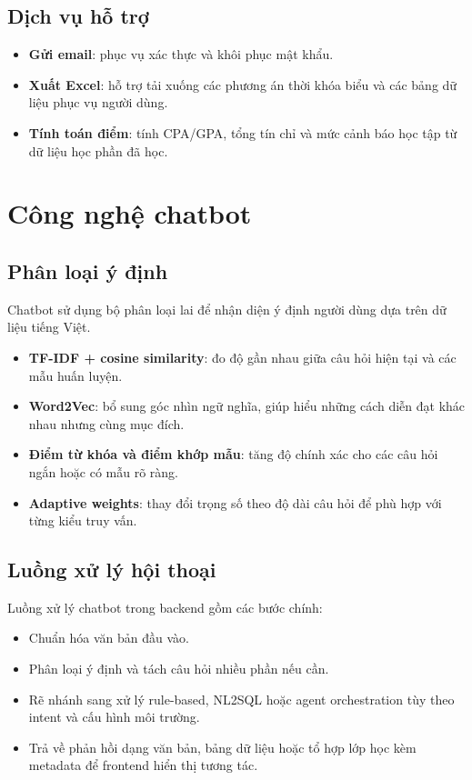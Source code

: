 \documentclass[12pt,a4paper]{report}
\begin{document}
\subsection{Dịch vụ hỗ trợ}
\begin{itemize}
    \item \textbf{Gửi email}: phục vụ xác thực và khôi phục mật khẩu.
    \item \textbf{Xuất Excel}: hỗ trợ tải xuống các phương án thời khóa biểu và các bảng dữ liệu phục vụ người dùng.
    \item \textbf{Tính toán điểm}: tính CPA/GPA, tổng tín chỉ và mức cảnh báo học tập từ dữ liệu học phần đã học.
\end{itemize}

\section{Công nghệ chatbot}
\subsection{Phân loại ý định}
Chatbot sử dụng bộ phân loại lai để nhận diện ý định người dùng dựa trên dữ liệu tiếng Việt.
\begin{itemize}
    \item \textbf{TF-IDF + cosine similarity}: đo độ gần nhau giữa câu hỏi hiện tại và các mẫu huấn luyện.
    \item \textbf{Word2Vec}: bổ sung góc nhìn ngữ nghĩa, giúp hiểu những cách diễn đạt khác nhau nhưng cùng mục đích.
    \item \textbf{Điểm từ khóa và điểm khớp mẫu}: tăng độ chính xác cho các câu hỏi ngắn hoặc có mẫu rõ ràng.
    \item \textbf{Adaptive weights}: thay đổi trọng số theo độ dài câu hỏi để phù hợp với từng kiểu truy vấn.
\end{itemize}

\subsection{Luồng xử lý hội thoại}
Luồng xử lý chatbot trong backend gồm các bước chính:
\begin{itemize}
    \item Chuẩn hóa văn bản đầu vào.
    \item Phân loại ý định và tách câu hỏi nhiều phần nếu cần.
    \item Rẽ nhánh sang xử lý rule-based, NL2SQL hoặc agent orchestration tùy theo intent và cấu hình môi trường.
    \item Trả về phản hồi dạng văn bản, bảng dữ liệu hoặc tổ hợp lớp học kèm metadata để frontend hiển thị tương tác.
\end{itemize}
\end{document}
